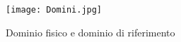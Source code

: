 

\begin{figure}[h]
	\centering
	\texttt{[image: Domini.jpg]}
	\caption{Dominio fisico e dominio di riferimento}
\label{fig:domini}
\end{figure}